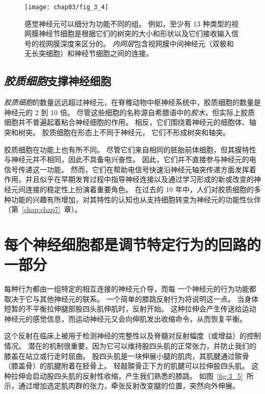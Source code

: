 \begin{figure}[htbp]
	\centering
	\texttt{[image: chap03/fig\_3\_4]}
	\caption{感觉神经元可以细分为功能不同的组。
		例如，至少有 13 种类型的视网膜神经节细胞是根据它们的树突的大小和形状以及它们接收输入信号的视网膜深度来区分的。
		\textit{内网层}包含视网膜中间神经元（双极和无长突细胞）和神经节细胞之间的连接\cite{dacey2003fireworks}。}
	\label{fig:3_4}
\end{figure}



\subsection{\textit{胶质细胞}支撑神经细胞}
\textit{胶质细胞}的数量远远超过神经元，在脊椎动物中枢神经系统中，胶质细胞的数量是神经元的 2 到 10 倍。
尽管这些细胞的名称源自希腊语中的\textit{胶水}，但实际上胶质细胞并不普遍起着粘合神经细胞的作用。
相反，它们围绕着神经元的细胞体、轴突和树突。
胶质细胞在形态上不同于神经元，
它们不形成树突和轴突。


胶质细胞在功能上也有所不同。
尽管它们来自相同的胚胎前体细胞，但其膜特性与神经元并不相同，因此不具备电兴奋性。
因此，它们并不直接参与神经元的电信号传递这一功能。
然而，它们在帮助电信号快速沿神经元轴突传递方面发挥着作用，并且似乎在早期发育过程中指导神经连接以及通过学习形成的新或改变的神经元间连接的稳定性上扮演着重要角色。
在过去的 10 年中，人们对胶质细胞的多种功能的兴趣有所增加，对其特性的认知也从支持细胞转变为神经元的功能性伙伴（第~\ref{chap:chap7}~章）。



\section{每个神经细胞都是调节特定行为的回路的一部分}

每种行为都由一组特定的相互连接的神经元介导，而每
一个神经元的行为功能都取决于它与其他神经元的联系。
一个简单的膝跳反射行为将说明这一点。 
当身体短暂的不平衡拉伸腿部股四头肌伸肌时，反射开始。
这种拉伸会产生传送给运动神经元的感觉信息，而运动神经元又会向伸肌发出收缩命令，从而恢复平衡。


这个反射在临床上被用于检测神经的完整性以及脊髓对反射幅度（或增益）的控制情况。 
潜在的机制很重要，因为它可以维持股四头肌的正常张力，并防止我们的膝盖在站立或行走时屈曲。 
股四头肌是一块伸展小腿的肌肉，其肌腱通过髌骨（膝盖骨）的肌腱附着在胫骨上。
轻敲髌骨正下方的肌腱可以拉伸股四头肌。 
这种拉伸会启动股四头肌的反射性收缩，产生我们熟悉的膝跳。 
如图~\ref{fig:3_5}~所示，通过增加选定肌肉群的张力，牵张反射改变腿的位置，突然向外伸展。

